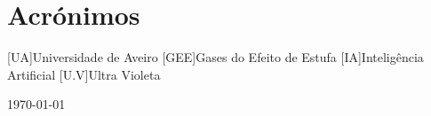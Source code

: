 \documentclass[a4paper, 11pt, onecolumn, oneside]{report}
\begin{document}
\chapter*{Acrónimos}
\begin{acronym}
[UA]{Universidade de Aveiro}
[GEE]{Gases do Efeito de Estufa}
[IA]{Inteligência Artificial}
[U.V]{Ultra Violeta}
\end{acronym}

\begin{flushright}
    \today
\end{flushright}

\printbibliography
\end{document}
